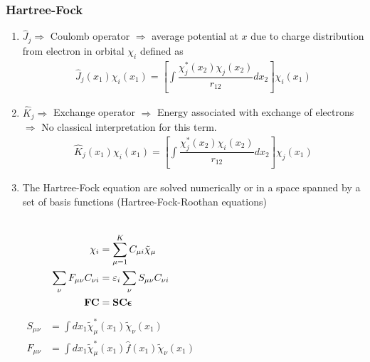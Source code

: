 \documentclass[slidestop,mathserif,compress,xcolor=svgnames]{beamer}
\begin{document}
\begin{frame}
\frametitle{\small Hartree-Fock}
\footnotesize{
\begin{enumerate}
\item $\hat{J}_j\Rightarrow$ Coulomb operator $\Rightarrow$ average potential at $x$ due to charge distribution from electron in orbital $\chi_i$ defined as
\begin{align*}
\hat{J}_j(x_1)\chi_i(x_1) = \left[\int\dfrac{\chi^\ast_j(x_2)\chi_j(x_2)}{r_{12}}dx_2\right]\chi_i(x_1)
\end{align*}
\item $\hat{K}_j\Rightarrow$ Exchange operator $\Rightarrow$ Energy associated with exchange of electrons $\Rightarrow$ No classical interpretation for this term.
\begin{align*}
\hat{K}_j(x_1)\chi_i(x_1) = \left[\int\dfrac{\chi^\ast_j(x_2)\chi_i(x_2)}{r_{12}}dx_2\right]\chi_j(x_1)
\end{align*}
\item The Hartree-Fock equation are solved numerically or in a space spanned by a set of basis functions (Hartree-Fock-Roothan equations)
\begin{columns}
\column{6cm}
\begin{align*}
\chi_i &= \sum^K_{\mu=1}C_{\mu i}\tilde{\chi}_\mu\\
\sum_\nu F_{\mu\nu}C_{\nu i} &= \varepsilon_i\sum_\nu S_{\mu\nu}C_{\nu i}\\
{\bf FC}&={\bf SC}{\boldsymbol\epsilon}
\end{align*}
\column{5cm}
\begin{align*}
S_{\mu\nu} &= \int dx_1\tilde{\chi}^\ast_\mu(x_1)\tilde{\chi}_\nu(x_1)\\
F_{\mu\nu} &= \int dx_1\tilde{\chi}^\ast_\mu(x_1)\hat{f}(x_1)\tilde{\chi}_\nu(x_1)
\end{align*}
\end{columns}
\end{enumerate}
}
\end{frame}
\end{document}
